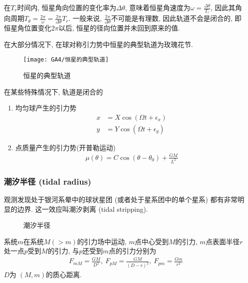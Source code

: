 在$T_r$时间内, 恒星角向位置的变化率为$\Delta \theta$, 意味着恒星角速度为$\omega=\frac{\Delta\theta}{T_r}$, 因此其角向周期$T_\theta=\frac{2\pi}{\omega}=\frac{2\pi}{\Delta \theta}T_r$. 一般来说, $\frac{2\pi}{\Delta\theta}$不可能是有理数, 因此轨道不会是闭合的, 即恒星角位置变化$2\pi$以后, 恒星的径向位置并未回到原来的值. 

在大部分情况下, 在球对称引力势中恒星的典型轨道为玫瑰花节. 

\begin{figure}[!htb]
    \centering
    \texttt{[image: GA4/恒星的典型轨道]}
    \caption{恒星的典型轨道}
\end{figure}

在某些特殊情况下, 轨道是闭合的
\begin{enumerate}
    \item 均匀球产生的引力势
    \begin{align*}
        x&=X\cos (\Omega t+\epsilon_x)\\
        y&=Y\cos (\Omega t+\epsilon_y)
    \end{align*}
    \item 点质量产生的引力势(开普勒运动)
    \begin{align*}
        \mu(\theta)=C\cos(\theta-\theta_0)+\frac{GM}{L^2}
    \end{align*}
\end{enumerate}


\subsubsection{潮汐半径 (tidal radius)}
观测发现处于银河系晕中的球状星团 (或者处于星系团中的单个星系) 都有非常明显的边界. 这一效应叫潮汐剥离 (tidal stripping). 
\begin{figure}[!htb]
    \centering
    \caption{潮汐半径}
\end{figure}

系统$m$在系统$M(>m)$的引力场中运动, $m$点中心受到$M$的引力, $m$点表面半径$r$处一点$p$受到$M$的引力, 与$p$还受到$m$点的引力分别为
\begin{align*}
    F_{mM}=\frac{GM}{D^2},\ F_{pM}=\frac{GM}{(D-r)^2},\ F_{pm}=\frac{Gm}{r^2}
\end{align*}
$D$为 $(M, m)$的质心距离. 

